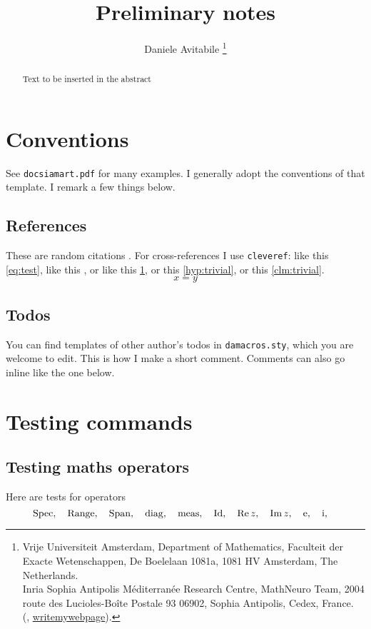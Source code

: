 \documentclass[a4paper]{siamart190516}
\title{Preliminary notes}
\author{%
  Daniele Avitabile%
  \thanks{%
    Vrije Universiteit Amsterdam,
    Department of Mathematics,
    Faculteit der Exacte Wetenschappen,
    De Boelelaan 1081a,
    1081 HV Amsterdam, The Netherlands.
  \protect\\
    Inria Sophia Antipolis M\'editerran\'ee Research Centre,
    MathNeuro Team,
    2004 route des Lucioles-Boîte Postale 93 06902,
    Sophia Antipolis, Cedex, France.
  \protect\\
    (\email{d.avitabile@vu.nl}, \url{writemywebpage}).
  }
}
\begin{document}
\maketitle

\begin{abstract}
  Text to be inserted in the abstract
\end{abstract}

\section{Conventions} \label{sec:conventions}
See \texttt{docsiamart.pdf} for many examples. I generally adopt the conventions of
that template. I remark a few things below.

\subsection{References} \label{sec:references}
These are random citations \cite{KoMa14,siam}. For cross-references I use
\texttt{cleveref}: like this
\cref{eq:test}, like this , or like this \cref{sec:conventions}, or
this \cref{hyp:trivial}, or this \cref{clm:trivial}.
\begin{equation}\label{eq:test}
  x = y
\end{equation}


\subsection{Todos}
You can find templates of other author's todos in
\texttt{damacros.sty}, which you are welcome to edit.
This is how I make a short comment. Comments can also go
inline like the one below.
%

\section{Testing commands}

\subsection{Testing maths operators}
Here are tests for operators
\[
  \operatorname{Spec}, \quad
  \operatorname{Range}, \quad
  \operatorname{Span}, \quad
  \operatorname{diag}, \quad
  \operatorname{meas}, \quad
  \operatorname{Id}, \quad
  \operatorname{Re} z, \quad
  \operatorname{Im} z, \quad
  \operatorname{e}, \quad
  \operatorname{i}, \quad
\]
\end{document}
